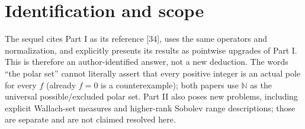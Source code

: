\documentclass[11pt]{article}
\newcommand{\N}{\mathbb N}
\begin{document}
\section*{Identification and scope}

The sequel cites Part I as its reference [34], uses the same operators and
normalization, and explicitly presents its results as pointwise upgrades of
Part I.  This is therefore an author-identified answer, not a new deduction.
The words ``the polar set'' cannot literally assert that every positive
integer is an actual pole for every $f$ (already $f=0$ is a counterexample);
both papers use $\N$ as the universal possible/excluded polar set.  Part II
also poses new problems, including explicit Wallach-set measures and
higher-rank Sobolev range descriptions; those are separate and are not
claimed resolved here.
\end{document}

